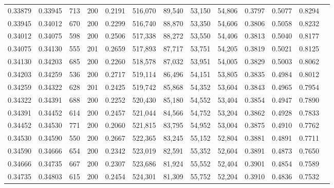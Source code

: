 \begin{tabular}{rrrrrrrrrrrrr}
0.33879 & 0.33945 &    713 & 200 &                                     0.2191 & 516,070 &  89,540 &  53,150 &  54,806 & 0.3797 & 0.5077 & 0.8294 \\
0.33945 & 0.34012 &    670 & 200 &                                     0.2299 & 516,740 &  88,870 &  53,350 &  54,606 & 0.3806 & 0.5058 & 0.8232 \\
0.34012 & 0.34075 &    598 & 200 &                                     0.2506 & 517,338 &  88,272 &  53,550 &  54,406 & 0.3813 & 0.5040 & 0.8177 \\
0.34075 & 0.34130 &    555 & 201 &                                     0.2659 & 517,893 &  87,717 &  53,751 &  54,205 & 0.3819 & 0.5021 & 0.8125 \\
0.34130 & 0.34203 &    685 & 200 &                                     0.2260 & 518,578 &  87,032 &  53,951 &  54,005 & 0.3829 & 0.5003 & 0.8062 \\
0.34203 & 0.34259 &    536 & 200 &                                     0.2717 & 519,114 &  86,496 &  54,151 &  53,805 & 0.3835 & 0.4984 & 0.8012 \\
0.34259 & 0.34322 &    628 & 201 &                                     0.2425 & 519,742 &  85,868 &  54,352 &  53,604 & 0.3843 & 0.4965 & 0.7954 \\
0.34322 & 0.34391 &    688 & 200 &                                     0.2252 & 520,430 &  85,180 &  54,552 &  53,404 & 0.3854 & 0.4947 & 0.7890 \\
0.34391 & 0.34452 &    614 & 200 &                                     0.2457 & 521,044 &  84,566 &  54,752 &  53,204 & 0.3862 & 0.4928 & 0.7833 \\
0.34452 & 0.34530 &    771 & 200 &                                     0.2060 & 521,815 &  83,795 &  54,952 &  53,004 & 0.3875 & 0.4910 & 0.7762 \\
0.34530 & 0.34590 &    550 & 200 &                                     0.2667 & 522,365 &  83,245 &  55,152 &  52,804 & 0.3881 & 0.4891 & 0.7711 \\
0.34590 & 0.34666 &    654 & 200 &                                     0.2342 & 523,019 &  82,591 &  55,352 &  52,604 & 0.3891 & 0.4873 & 0.7650 \\
0.34666 & 0.34735 &    667 & 200 &                                     0.2307 & 523,686 &  81,924 &  55,552 &  52,404 & 0.3901 & 0.4854 & 0.7589 \\
0.34735 & 0.34803 &    615 & 200 &                                     0.2454 & 524,301 &  81,309 &  55,752 &  52,204 & 0.3910 & 0.4836 & 0.7532 \\

\end{tabular}
